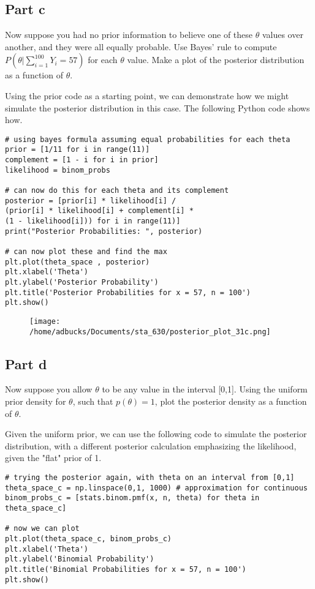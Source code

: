 \documentclass[12pt, letterpaper]{article}
\begin{document}
\subsection{Part c} 

Now suppose you had no prior information to believe one of these $\theta$ values over another, and they were all equally probable. Use Bayes' rule to compute $P(\theta | \sum_{i=1}^100 Y_i = 57)$ for each $\theta$ value. Make a plot of the posterior distribution as a function of $\theta$. 

Using the prior code as a starting point, we can demonstrate how we might simulate the posterior distribution in this case. The following Python code shows how. 

\begin{verbatim}
# using bayes formula assuming equal probabilities for each theta 
prior = [1/11 for i in range(11)]
complement = [1 - i for i in prior] 
likelihood = binom_probs 

# can now do this for each theta and its complement 
posterior = [prior[i] * likelihood[i] /
(prior[i] * likelihood[i] + complement[i] *
(1 - likelihood[i])) for i in range(11)]
print("Posterior Probabilities: ", posterior)

# can now plot these and find the max 
plt.plot(theta_space , posterior) 
plt.xlabel('Theta') 
plt.ylabel('Posterior Probability') 
plt.title('Posterior Probabilities for x = 57, n = 100') 
plt.show() 
\end{verbatim} 

\begin{figure} 
\texttt{[image: /home/adbucks/Documents/sta\_630/posterior\_plot\_31c.png]}
\end{figure} 

\subsection{Part d}

Now suppose you allow $\theta$ to be any value in the interval [0,1]. Using the uniform prior density for $\theta$, such that $p(\theta) = 1$, plot the posterior density as a function of $\theta$. 

Given the uniform prior, we can use the following code to simulate the posterior distribution, with a different posterior calculation emphasizing the likelihood, given the "flat" prior of 1. 

\begin{verbatim} 
# trying the posterior again, with theta on an interval from [0,1]
theta_space_c = np.linspace(0,1, 1000) # approximation for continuous 
binom_probs_c = [stats.binom.pmf(x, n, theta) for theta in theta_space_c] 

# now we can plot 
plt.plot(theta_space_c, binom_probs_c) 
plt.xlabel('Theta') 
plt.ylabel('Binomial Probability') 
plt.title('Binomial Probabilities for x = 57, n = 100') 
plt.show() 
\end{verbatim} 
\end{document}
